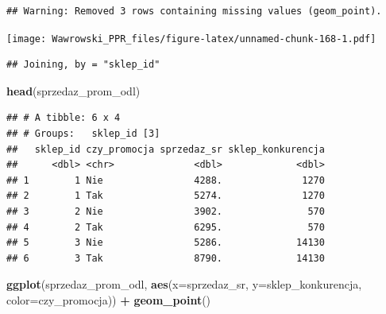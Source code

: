 \documentclass[]{book}
\newenvironment{Shaded}{\begin{snugshade}}{\end{snugshade}}
\newcommand{\KeywordTok}[1]{\textcolor[rgb]{0.13,0.29,0.53}{\textbf{#1}}}
\newcommand{\DataTypeTok}[1]{\textcolor[rgb]{0.13,0.29,0.53}{#1}}
\newcommand{\DecValTok}[1]{\textcolor[rgb]{0.00,0.00,0.81}{#1}}
\newcommand{\StringTok}[1]{\textcolor[rgb]{0.31,0.60,0.02}{#1}}
\newcommand{\OperatorTok}[1]{\textcolor[rgb]{0.81,0.36,0.00}{\textbf{#1}}}
\newcommand{\NormalTok}[1]{#1}
\begin{document}
\begin{verbatim}
## Warning: Removed 3 rows containing missing values (geom_point).
\end{verbatim}

\texttt{[image: Wawrowski\_PPR\_files/figure-latex/unnamed-chunk-168-1.pdf]}

\begin{Shaded}
\end{Shaded}

\begin{verbatim}
## Joining, by = "sklep_id"
\end{verbatim}

\begin{Shaded}
\begin{Highlighting}[]
\KeywordTok{head}\NormalTok{(sprzedaz_prom_odl)}
\end{Highlighting}
\end{Shaded}

\begin{verbatim}
## # A tibble: 6 x 4
## # Groups:   sklep_id [3]
##   sklep_id czy_promocja sprzedaz_sr sklep_konkurencja
##      <dbl> <chr>              <dbl>             <dbl>
## 1        1 Nie                4288.              1270
## 2        1 Tak                5274.              1270
## 3        2 Nie                3902.               570
## 4        2 Tak                6295.               570
## 5        3 Nie                5286.             14130
## 6        3 Tak                8790.             14130
\end{verbatim}

\begin{Shaded}
\begin{Highlighting}[]
\KeywordTok{ggplot}\NormalTok{(sprzedaz_prom_odl, }\KeywordTok{aes}\NormalTok{(}\DataTypeTok{x=}\NormalTok{sprzedaz_sr, }\DataTypeTok{y=}\NormalTok{sklep_konkurencja, }\DataTypeTok{color=}\NormalTok{czy_promocja)) }\OperatorTok{+}\StringTok{ }
\StringTok{  }\KeywordTok{geom_point}\NormalTok{()}
\end{Highlighting}
\end{Shaded}
\end{document}
